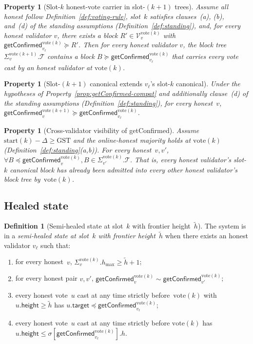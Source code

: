\documentclass{article}
\newcommand{\T}[0]{\ensuremath{\mathcal{T}}}
\newcommand{\V}[0]{\ensuremath{\mathcal{V}}}
\newcommand{\target}{\mathsf{target}}
\newcommand{\height}{\mathsf{height}}
\newcommand{\hmax}{\ensuremath{h_{\max}}\xspace}
\newcommand{\start}{\ensuremath{\mathrm{start}}}
\newcommand{\vote}{\ensuremath{\mathrm{vote}}}
\newcommand{\GST}{\ensuremath{\mathrm{GST}}\xspace}
\newcommand{\comm}[1]{\ensuremath{\widetilde{#1}}}
\newcommand{\getConfirmed}{\textsf{getConfirmed}\xspace}
\theoremstyle{plain}
\newtheorem{property}[theorem]{Property}
\theoremstyle{definition}
\newtheorem{definition}{Definition}
\theoremstyle{remark}
\begin{document}
\begin{property}[Slot-$k$ honest-vote carrier in slot-$(k{+}1)$ trees]\label{prop:vote-carrier}
Assume all honest follow Definition~\ref{def:voting-rule}, slot~$k$ satisfies clauses~(a), (b), and~(d) of the standing assumptions (Definition~\ref{def:standing}), and, for every honest validator $v$, there exists a block $R' \in \V_v^{\vote(k)}$ with $\getConfirmed_{v_\ell}^{\vote(k)} \succeq R'$.
Then for every honest validator $v$, the block tree $\Sigma_v^{\vote(k+1)}.\T$ contains a block $B \succeq \getConfirmed_{v_\ell}^{\vote(k)}$ that carries every vote cast by an honest validator at $\vote(k)$.
\end{property}

\begin{property}[Slot-$(k{+}1)$ canonical extends $v_\ell$'s slot-$k$ canonical]\label{prop:target-dominance}
Under the hypotheses of Property~\ref{prop:getConfirmed-compat} and additionally clause~(d) of the standing assumptions (Definition~\ref{def:standing}), for every honest~$v$, $\getConfirmed_v^{\vote(k+1)} \succeq \getConfirmed_{v_\ell}^{\vote(k)}$.
\end{property}

\begin{property}[Cross-validator visibility of \getConfirmed]\label{prop:getConfirmed-visible}
Assume $\start(k) - \Delta \geq \GST$ and the online-honest majority holds at $\vote(k)$ (Definition~\ref{def:standing}(a,b)).
For every honest~$v,v'$, $\forall B \preceq \getConfirmed_v^{\vote(k)}, B\in \Sigma_{v'}^{\vote(k)}.\T$.
That is, every honest validator's slot-$k$ canonical block has already been admitted into every other honest validator's block tree by~$\vote(k)$.
\end{property}

\subsection{Healed state}\label{sec:healed}

\begin{definition}[Semi-healed state at slot~$k$ with frontier height~$\comm{h}$]\label{def:semi-healed}
The system is in a \emph{semi-healed state at slot~$k$ with frontier height~$\comm{h}$} when there exists an honest validator $v_\ell$ such that:
\begin{enumerate}
  \item\label{rev:def:healed-state:h} for every honest~$v$, $\Sigma_v^{\vote(k)}.\hmax \geq \comm{h}+1$;
  \item\label{rev:def:healed-state:compat} for every honest pair $v, v'$, $\getConfirmed_v^{\vote(k)} \sim \getConfirmed_{v'}^{\vote(k)}$;
  \item\label{rev:def:healed-state:cap} every honest vote~$u$ cast at any time strictly before~$\vote(k)$ with $u.\height \geq \comm{h}$ has $u.\target \preceq \getConfirmed_{v_\ell}^{\vote(k)}$;
  \item\label{rev:def:healed-state:vote-h} every honest vote~$u$ cast at any time strictly before $\vote(k)$ has $u.\height \leq \sigma[\getConfirmed_{v_\ell}^{\vote(k)}].h$.
\end{enumerate}
\end{definition}
\end{document}

